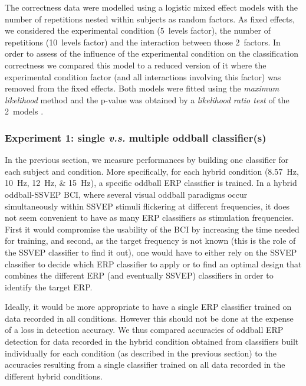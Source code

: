 \documentclass[10pt]{article}
\begin{document}
        The correctness data were modelled using a logistic mixed effect models \parencite{Jaeger2008a} with the number of repetitions nested within subjects as random factors.
        As fixed effects, we considered the experimental condition (5~levels factor), the number of repetitions (10~levels factor) and the interaction between those 2~factors.
        In order to assess of the influence of the experimental condition on the classification correctness we compared this model to a reduced version of it where the experimental condition factor (and all interactions involving this factor) was removed from the fixed effects.
        Both models were fitted using the \emph{maximum likelihood} method and the p-value was obtained by a \emph{likelihood ratio test} of the 2~models \parencite{Pinheiro2000}.

        \subsubsection{Experiment 1: single \emph{v.s.} multiple oddball classifier(s)}
        \label{sec:2.3.1AnalysisExp1ter}
        In the previous section, we measure performances by building one classifier for each subject and condition.
        More specifically, for each hybrid condition (\SIlist[list-units = single]{8.57;10;12;15}{\Hz}), a specific oddball ERP classifier is trained.
        In a hybrid oddball-SSVEP BCI, where several visual oddball paradigms occur simultaneously within SSVEP stimuli flickering at different frequencies, it does not seem convenient to have as many ERP classifiers as stimulation frequencies.
        First it would compromise the usability of the BCI by increasing the time needed for training, and second, as the target frequency is not known (this is the role of the SSVEP classifier to find it out), one would have to either rely on the SSVEP classifier to decide which ERP classifier to apply or to find an optimal design that combines the different ERP (and eventually SSVEP) classifiers in order to identify the target ERP.

        Ideally, it would be more appropriate to have a single ERP classifier trained on data recorded in all conditions.
        However this should not be done at the expense of a loss in detection accuracy.
        We thus compared accuracies of oddball ERP detection for data recorded in the hybrid condition obtained from classifiers built individually for each condition (as described in the previous section) to the accuracies resulting from a single classifier trained on all data recorded in the different hybrid conditions.
\end{document}
